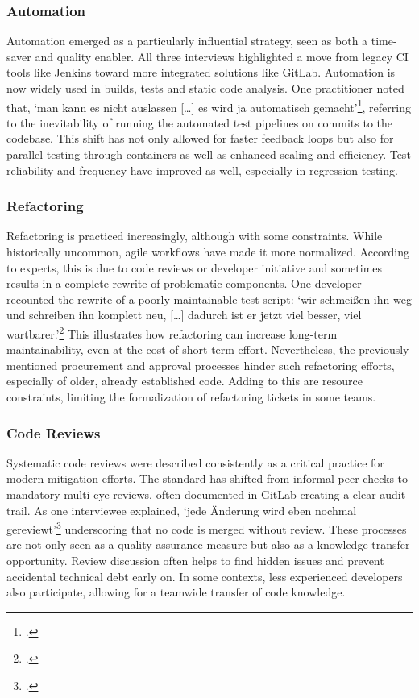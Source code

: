 \subsubsection{Automation}
Automation emerged as a particularly influential strategy, seen as both a time-saver and quality enabler. All three interviews highlighted a move from legacy CI tools like Jenkins toward more integrated solutions like GitLab. Automation is now widely used in builds, tests and static code analysis.
One practitioner noted that, `man kann es nicht auslassen [\ldots] es wird ja automatisch gemacht'\footcite{interview2}, referring to the inevitability of running the automated test pipelines on commits to the codebase. This shift has not only allowed for faster feedback loops but also for parallel testing through
containers as well as enhanced scaling and efficiency. Test reliability and frequency have improved as well, especially in regression testing.\\

\subsubsection{Refactoring}
Refactoring is practiced increasingly, although with some constraints. While historically uncommon, agile workflows have made it more normalized. According to experts, this is due to code reviews or developer initiative and sometimes results in a complete rewrite of problematic components.
One developer recounted the rewrite of a poorly maintainable test script: `wir schmeißen ihn weg und schreiben ihn komplett neu, [\ldots] dadurch ist er jetzt viel besser, viel wartbarer.'\footcite{interview2} This illustrates how refactoring can increase long-term maintainability, even at the cost of short-term effort.
Nevertheless, the previously mentioned procurement and approval processes hinder such refactoring efforts, especially of older, already established code. Adding to this are resource constraints, limiting the formalization of refactoring tickets in some teams.\\

\subsubsection{Code Reviews}
Systematic code reviews were described consistently as a critical practice for modern mitigation efforts. The standard has shifted from informal peer checks to mandatory multi-eye reviews, often documented in GitLab creating a clear audit trail. As one interviewee explained, `jede Änderung wird eben nochmal gereviewt'\footcite{interview2}
underscoring that no code is merged without review. These processes are not only seen as a quality assurance measure but also as a knowledge transfer opportunity. Review discussion often helps to find hidden issues and prevent accidental technical debt early on. In some contexts,
less experienced developers also participate, allowing for a teamwide transfer of code knowledge.\\


